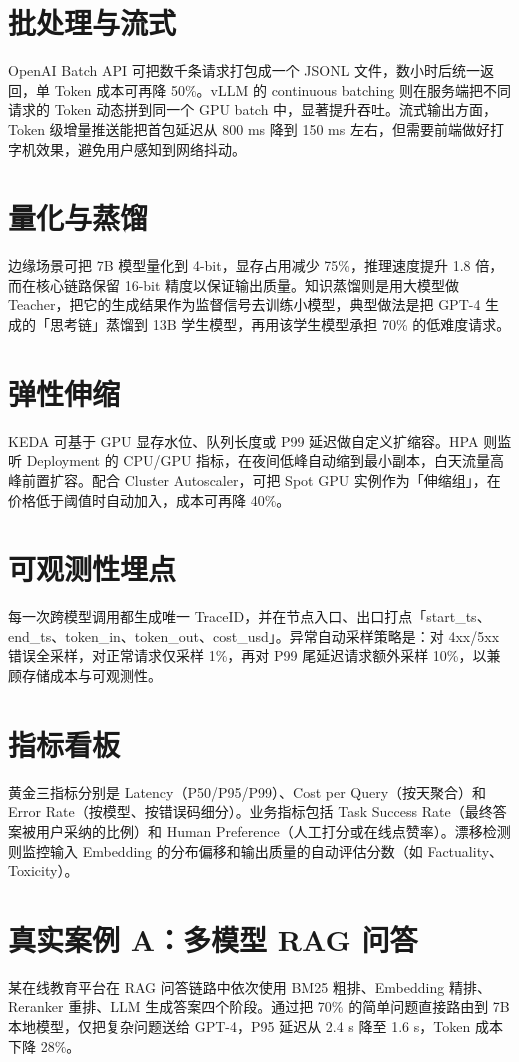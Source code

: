 \chapter{批处理与流式}
OpenAI Batch API 可把数千条请求打包成一个 JSONL 文件，数小时后统一返回，单 Token 成本可再降 50\%{}。vLLM 的 continuous batching 则在服务端把不同请求的 Token 动态拼到同一个 GPU batch 中，显著提升吞吐。流式输出方面，Token 级增量推送能把首包延迟从 800 ms 降到 150 ms 左右，但需要前端做好打字机效果，避免用户感知到网络抖动。\par
\chapter{量化与蒸馏}
边缘场景可把 7B 模型量化到 4-bit，显存占用减少 75\%{}，推理速度提升 1.8 倍，而在核心链路保留 16-bit 精度以保证输出质量。知识蒸馏则是用大模型做 Teacher，把它的生成结果作为监督信号去训练小模型，典型做法是把 GPT-4 生成的「思考链」蒸馏到 13B 学生模型，再用该学生模型承担 70\%{} 的低难度请求。\par
\chapter{弹性伸缩}
KEDA 可基于 GPU 显存水位、队列长度或 P99 延迟做自定义扩缩容。HPA 则监听 Deployment 的 CPU/GPU 指标，在夜间低峰自动缩到最小副本，白天流量高峰前置扩容。配合 Cluster Autoscaler，可把 Spot GPU 实例作为「伸缩组」，在价格低于阈值时自动加入，成本可再降 40\%{}。\par
\chapter{可观测性埋点}
每一次跨模型调用都生成唯一 TraceID，并在节点入口、出口打点「start\_{}ts、end\_{}ts、token\_{}in、token\_{}out、cost\_{}usd」。异常自动采样策略是：对 4xx/5xx 错误全采样，对正常请求仅采样 1\%{}，再对 P99 尾延迟请求额外采样 10\%{}，以兼顾存储成本与可观测性。\par
\chapter{指标看板}
黄金三指标分别是 Latency（P50/P95/P99）、Cost per Query（按天聚合）和 Error Rate（按模型、按错误码细分）。业务指标包括 Task Success Rate（最终答案被用户采纳的比例）和 Human Preference（人工打分或在线点赞率）。漂移检测则监控输入 Embedding 的分布偏移和输出质量的自动评估分数（如 Factuality、Toxicity）。\par
\chapter{真实案例 A：多模型 RAG 问答}
某在线教育平台在 RAG 问答链路中依次使用 BM25 粗排、Embedding 精排、Reranker 重排、LLM 生成答案四个阶段。通过把 70\%{} 的简单问题直接路由到 7B 本地模型，仅把复杂问题送给 GPT-4，P95 延迟从 2.4 s 降至 1.6 s，Token 成本下降 28\%{}。\par
